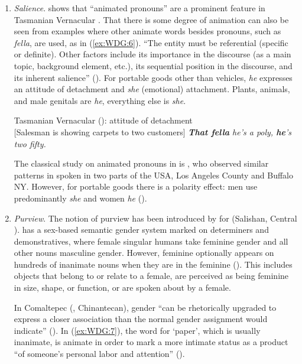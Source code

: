 \documentclass[output=collectionpaper]{langsci/langscibook}
\begin{document}
\begin{enumerate}[label=(\roman*)]
\item \textit{Salience}. \cite{Pawley2004} shows that ``animated pronouns'' are a prominent feature in Tasmanian Vernacular . That there is some degree of animation can also be seen from examples where other animate words besides pronouns, such as \textit{fella}, are used, as in (\ref{ex:WDG:6}). ``The entity must be referential (specific or definite). Other factors include its importance in the discourse (as a main topic, background element, etc.), its sequential position in the discourse, and its inherent salience'' (\citealt[114]{Pawley2004}). For portable goods other than vehicles, \textit{he} expresses an attitude of detachment and \textit{she} (emotional) attachment. Plants, animals, and male genitals are \textit{he}, everything else is \textit{she}.

\ea\label{ex:WDG:6}
Tasmanian Vernacular  (\citealt[126]{Pawley2004}): attitude of detachment\\
{[}Salesman is showing carpets to two customers{]} \textit{\textbf{That fella} he's a poly, \textbf{he}'s two fifty.}\\
\z

The classical study on animated pronouns in  is \cite{Mathiot1978}, who observed similar patterns in spoken  in two parts of the USA, Los Angeles County and Buffalo NY. However, for portable goods there is a polarity effect: men use predominantly \textit{she} and women \textit{he} (\citealt[134]{Pawley2004}).

\item \textit{Purview}. The notion of purview has been introduced by \cite{Gerdts2013} for  (Salishan, Central ).  has a sex-based semantic gender system marked on determiners and demonstratives, where female singular humans take feminine gender and all other nouns masculine gender. However, feminine optionally appears on hundreds of inanimate nouns when they are in the feminine  (\citealt{Gerdts2013}). This includes objects that belong to or relate to a female, are perceived as being feminine in size, shape, or function, or are spoken about by a female.

In Comaltepec  (, Chinantecan), gender ``can be rhetorically upgraded to express a closer association than the normal gender assignment would indicate'' (\citealt[57]{Anderson1989a}). In (\ref{ex:WDG:7}), the word for `paper', which is usually inanimate, is animate in order to mark a more intimate status as a product ``of someone's personal labor and attention'' (\citealt[57]{Anderson1989a}).


\end{enumerate}
\end{document}
